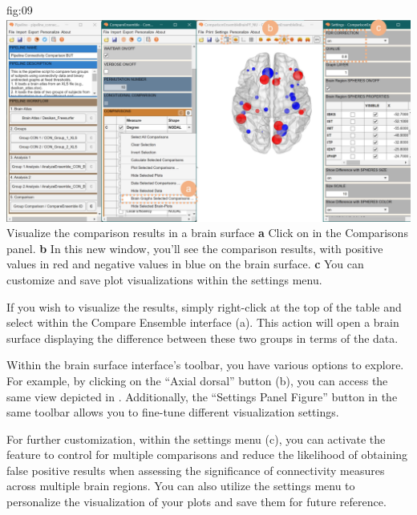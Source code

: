 \documentclass[justified]{tufte-handout}
\begin{document}
	{fig:09}
	{
	\includegraphics{fig09.jpg}
	}
	{Visualize the comparison results in a brain surface}
	{
	{\bf a} Click on  in the Comparisons panel.
	{\bf b} In this new window, you'll see the comparison results, with positive values in red and negative values in blue on the brain surface.
{\bf c} You can customize and save plot visualizations within the settings menu.
	}

If you wish to visualize the results, simply right-click at the top of the table and select  within the Compare Ensemble interface (a). This action will open a brain surface displaying the difference between these two groups in terms of the  data.

Within the brain surface interface's toolbar, you have various options to explore. For example, by clicking on the “Axial dorsal” button (b), you can access the same view depicted in . Additionally, the “Settings Panel Figure” button in the same toolbar allows you to fine-tune different visualization settings.

For further customization, within the settings menu (c), you can activate the  feature to control for multiple comparisons and reduce the likelihood of obtaining false positive results when assessing the significance of connectivity measures across multiple brain regions. You can also utilize the settings menu to personalize the visualization of your plots and save them for future reference.
\end{document}
